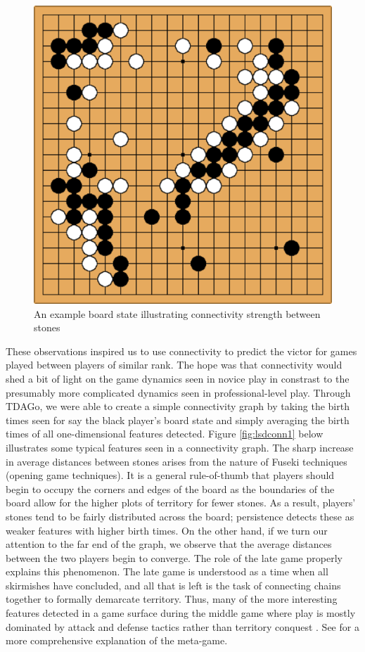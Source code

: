 \documentclass[11pt]{article}
\begin{document}
\begin{figure}[ht]
  \centering
  \includegraphics[scale=0.5]{conn1.png}
  \caption{An example board state illustrating connectivity strength between stones}
  \label{fig:conn1}
\end{figure}

These observations inspired us to use connectivity to predict the victor for games played between players of similar rank. The hope was that connectivity would shed a bit of light on the game dynamics seen in novice play in constrast to the presumably more complicated dynamics seen in professional-level play. Through TDAGo, we were able to create a simple connectivity graph by taking the birth times seen for say the black player's board state and simply averaging the birth times of all one-dimensional features detected. Figure \ref{fig:lsdconn1} below illustrates some typical features seen in a connectivity graph. The sharp increase in average distances between stones arises from the nature of Fuseki techniques (opening game techniques). It is a general rule-of-thumb that players should begin to occupy the corners and edges of the board as the boundaries of the board allow for the higher plots of territory for fewer stones. As a result, players' stones tend to be fairly distributed across the board; persistence detects these as weaker features with higher birth times. On the other hand, if we turn our attention to the far end of the graph, we observe that the average distances between the two players begin to converge. The role of the late game properly explains this phenomenon. The late game is understood as a time when all skirmishes have concluded, and all that is left is the task of connecting chains together to formally demarcate territory. Thus, many of the more interesting features detected in a game surface during the middle game where play is mostly dominated by attack and defense tactics rather than territory conquest \cite{terms}. See \cite{terms} for a more comprehensive explanation of the meta-game.
\end{document}
